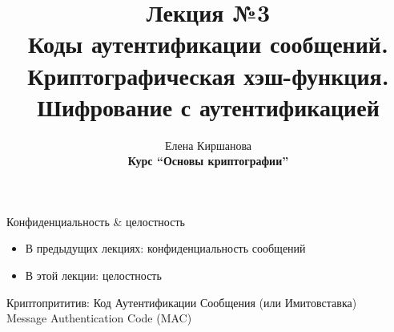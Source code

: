 \documentclass[usenames,dvipsnames,8pt,aspectratio=169]{beamer}
\title{Лекция №3 \\[10pt]
	Коды аутентификации сообщений. \\[5pt]
	Криптографическая хэш-функция. \\[5pt] 
	Шифрование с аутентификацией}
\date{ Елена Киршанова \\  \textbf{Курс ``Основы криптографии''} \\  }
\begin{document}
	
\begin{frame}
	\titlepage
\end{frame}

%	
%	
%	
%	
%	
%	


\begin{frame}{Конфиденциальность \& целостность}
\LARGE 

\begin{itemize}
	\itemsep 1em
	\item В предыдущих лекциях: {\color{Orange} конфиденциальность} сообщений
	\item В этой лекции:  {\color{Orange} целостность}
\end{itemize}

\vspace{20pt}
\LARGE {\color{Orange}Криптопрититив}: Код Аутентификации Сообщения (или Имитовставка)  \\[5pt] 
Message Authentication Code (MAC) 


\end{frame}
\end{document}
